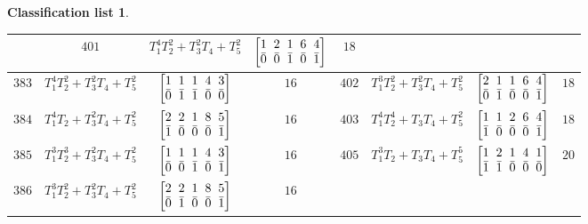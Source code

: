 \documentclass[pdftex]{sigma}%
\theoremstyle{definition}
\newtheorem{class-list}[thm]{Classification list}
\numberwithin{equation}{section}
\begin{document}
\begin{class-list}
\begin{table}[h!]
\begin{tabu}{c|c|c|c||c|c|c|c}
&${401}$&${T_{1}^{4}T_{2}^{2}+T_{3}^{2}T_{4}+T_{5}^{2}}$
&$\arraycolsep=1mm\begin{bmatrix}{1} & {2} & {1} & {6} & {4} \\ {\bar{0}} & {\bar{0}} & {\bar{1}} & {\bar{0}} & {\bar{1}}\end{bmatrix}$&${18}$
\\
\hline
${383}$&${T_{1}^{4}T_{2}^{2}+T_{3}^{2}T_{4}+T_{5}^{2}}$
&$\arraycolsep=1mm\begin{bmatrix}{1} & {1} & {1} & {4} & {3} \\ {\bar{0}} & {\bar{1}} & {\bar{1}} & {\bar{0}} & {\bar{0}}\end{bmatrix}$&${16}$
&${402}$&${T_{1}^{3}T_{2}^{2}+T_{3}^{2}T_{4}+T_{5}^{2}}$
&$\arraycolsep=1mm\begin{bmatrix}{2} & {1} & {1} & {6} & {4} \\ {\bar{0}} & {\bar{1}} & {\bar{0}} & {\bar{0}} & {\bar{1}}\end{bmatrix}$&${18}$
\\
\hline
${384}$&${T_{1}^{4}T_{2}+T_{3}^{2}T_{4}+T_{5}^{2}}$
&$\arraycolsep=1mm\begin{bmatrix}{2} & {2} & {1} & {8} & {5} \\ {\bar{1}} & {\bar{0}} & {\bar{0}} & {\bar{0}} & {\bar{1}}\end{bmatrix}$&${16}$
&${403}$&${T_{1}^{4}T_{2}^{4}+T_{3}T_{4}+T_{5}^{2}}$
&$\arraycolsep=1mm\begin{bmatrix}{1} & {1} & {2} & {6} & {4} \\ {\bar{1}} & {\bar{0}} & {\bar{0}} & {\bar{0}} & {\bar{1}}\end{bmatrix}$&${18}$
\\
\hline
${385}$&${T_{1}^{3}T_{2}^{3}+T_{3}^{2}T_{4}+T_{5}^{2}}$
&$\arraycolsep=1mm\begin{bmatrix}{1} & {1} & {1} & {4} & {3} \\ {\bar{0}} & {\bar{0}} & {\bar{1}} & {\bar{0}} & {\bar{1}}\end{bmatrix}$&${16}$
&${405}$&${T_{1}^{3}T_{2}+T_{3}T_{4}+T_{5}^{5}}$
&$\arraycolsep=1mm\begin{bmatrix}{1} & {2} & {1} & {4} & {1} \\ {\bar{1}} & {\bar{1}} & {\bar{0}} & {\bar{0}} & {\bar{0}}\end{bmatrix}$&${20}$
\\
\hline
${386}$&${T_{1}^{3}T_{2}^{2}+T_{3}^{2}T_{4}+T_{5}^{2}}$
&$\arraycolsep=1mm\begin{bmatrix}{2} & {2} & {1} & {8} & {5} \\ {\bar{0}} & {\bar{1}} & {\bar{0}} & {\bar{0}} & {\bar{1}}\end{bmatrix}$&${16}$

\end{tabu}
\end{table}
\end{class-list}
\end{document}
